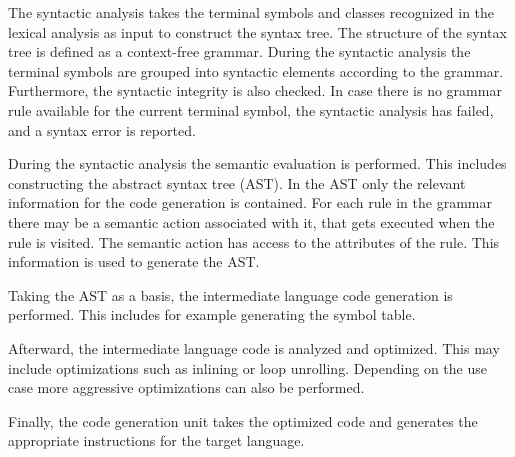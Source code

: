 
The syntactic analysis takes the terminal symbols and classes recognized in the lexical analysis as input to construct the syntax tree. The structure of the syntax tree is defined as a context-free grammar. During the syntactic analysis the terminal symbols are grouped into syntactic elements according to the grammar. Furthermore, the syntactic integrity is also checked. In case there is no grammar rule available for the current terminal symbol, the syntactic analysis has failed, and a syntax error is reported.


During the syntactic analysis the semantic evaluation is performed. This includes constructing the abstract syntax tree (AST). In the AST only the relevant information for the code generation is contained. For each rule in the grammar there may be a semantic action associated with it, that gets executed when the rule is visited. The semantic action has access to the attributes of the rule. This information is used to generate the AST.  

Taking the AST as a basis, the intermediate language code generation is performed. This includes for example generating the symbol table. 

Afterward, the intermediate language code is analyzed and optimized. This may include optimizations such as inlining or loop unrolling. Depending on the use case more aggressive optimizations can also be performed. 

Finally, the code generation unit takes the optimized code and generates the appropriate instructions for the target language. 